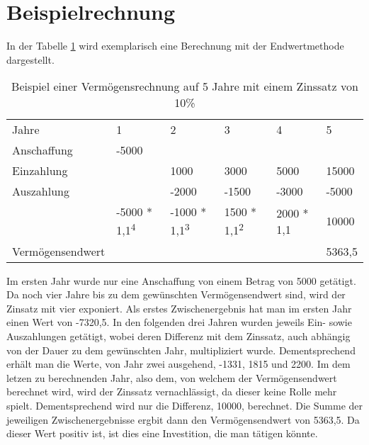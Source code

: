 \section{Beispielrechnung}

In der Tabelle \ref{tb:VermoegensendwertRechnung} wird exemplarisch eine Berechnung mit der Endwertmethode dargestellt.
\bigskip

\begin{table}[!h]
    \caption{Beispiel einer Vermögensrechnung auf 5 Jahre mit einem Zinssatz von 10\%}
    \begin{tabular}{llllll}
        \cline{1-6} \rowcolor{gray}
        Jahre            & 1                              & 2                              & 3                             & 4          & 5      \\ \cline{1-6} \rowcolor{white}
        Anschaffung      & -5000                          &                                &                               &            &        \\ \cline{1-6} \rowcolor{white}
        Einzahlung       &                                & 1000                           & 3000                          & 5000       & 15000  \\ \cline{1-6} \rowcolor{white}
        Auszahlung       &                                & -2000                          & -1500                         & -3000      & -5000  \\ \cline{1-6} \rowcolor{white}
                         & -5000 * 1,1\textsuperscript{4} & -1000 * 1,1\textsuperscript{3} & 1500 * 1,1\textsuperscript{2} & 2000 * 1,1 & 10000  \\ \rowcolor{white}
        Vermögensendwert &                                &                                &                               &            & 5363,5 \\ \cline{1-6}
    \end{tabular}
    \label{tb:VermoegensendwertRechnung}
\end{table}

\bigskip

\noindent
Im ersten Jahr wurde nur eine Anschaffung von einem Betrag von 5000 getätigt. Da noch vier Jahre bis zu dem gewünschten Vermögensendwert sind, wird der Zinsatz mit vier exponiert. Als erstes Zwischenergebnis hat man im ersten Jahr einen Wert von -7320,5. In den folgenden drei Jahren wurden jeweils Ein- sowie Auszahlungen getätigt, wobei deren Differenz mit dem Zinssatz, auch abhängig von der Dauer zu dem gewünschten Jahr, multipliziert wurde. Dementsprechend erhält man die Werte, von Jahr zwei ausgehend, -1331, 1815 und 2200. Im dem letzen zu berechnenden Jahr, also dem, von welchem der Vermögensendwert berechnet wird, wird der Zinssatz vernachlässigt, da dieser keine Rolle mehr spielt. Dementsprechend wird nur die Differenz, 10000, berechnet. Die Summe der jeweiligen Zwischenergebnisse ergbit dann den Vermögensendwert von 5363,5. \linebreak
Da dieser Wert positiv ist, ist dies eine Investition, die man tätigen könnte.

